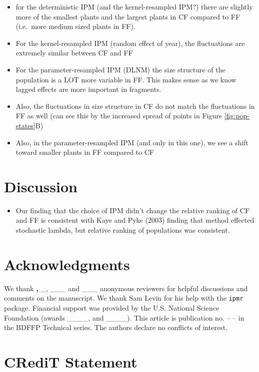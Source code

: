 \documentclass[
]{article}
\providecommand{\tightlist}{%
  \setlength{\itemsep}{0pt}\setlength{\parskip}{0pt}}
\begin{document}
\begin{itemize}
\item
  for the deterministic IPM (and the kernel-resampled IPM?) there are slightly more of the smallest plants and the largest plants in CF compared to FF (i.e.~more medium sized plants in FF).
\item
  For the kernel-resampled IPM (random effect of year), the fluctuations are extremely similar between CF and FF
\item
  For the parameter-resampled IPM (DLNM) the size structure of the population is a LOT more variable in FF.
  This makes sense as we know lagged effects are more important in fragments.
\item
  Also, the fluctuations in size structure in CF do not match the fluctuations in FF as well (can see this by the increased spread of points in Figure \ref{fig:pop-states}B)
\item
  Also, in the parameter-resampled IPM (and only in this one), we see a shift toward smaller plants in FF compared to CF
\end{itemize}

\hypertarget{discussion}{%
\section{Discussion}\label{discussion}}

\begin{itemize}
\tightlist
\item
  Our finding that the choice of IPM didn't change the relative ranking of CF and FF is consistent with Kaye and Pyke (2003) finding that method effected stochastic lambda, but relative ranking of populations was consistent.
\end{itemize}

\hypertarget{acknowledgments}{%
\section{Acknowledgments}\label{acknowledgments}}

We thank \textbf{,} \_, \_\_\_ and \_\_\_ anonymous reviewers for helpful discussions and comments on the manuscript.
We thank Sam Levin for his help with the \texttt{ipmr} package.
Financial support was provided by the U.S.
National Science Foundation (awards \_\_\_\_, and \_\_\_\_).
This article is publication no. -- -- in the BDFFP Technical series.
The authors declare no conflicts of interest.

\hypertarget{credit-statement}{%
\section{CRediT Statement}\label{credit-statement}}
\end{document}
